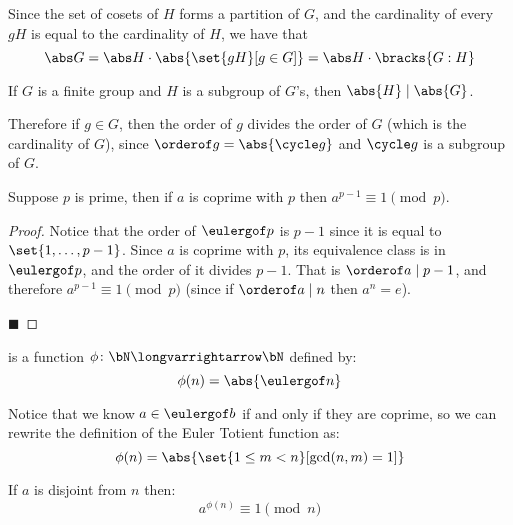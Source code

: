 Since the set of cosets of $H$ forms a partition of $G$, and the cardinality of every $gH$ is equal to the cardinality of $H$, we have that
\[ \abs G = \abs H \cdot \abs{\set{gH}[g\in G]} = \abs H\cdot \bracks{G:H} \]

\begin{thrm*}

    If $G$ is a finite group and $H$ is a subgroup of $G$'s, then $\abs{H}\divides\abs{G}$.

\end{thrm*}

Therefore if $g\in G$, then the order of $g$ divides the order of $G$ (which is the cardinality of $G$), since $\orderof g=\abs{\cycle g}$ and $\cycle g$ is a subgroup of $G$.

\begin{thrm*}

    Suppose $p$ is prime, then if $a$ is coprime with $p$ then $a^{p-1}\equiv 1\pmod p$.

\end{thrm*}

\begin{proof}

    Notice that the order of $\eulergof p$ is $p-1$ since it is equal to $\set{1,\dots,p-1}$.
    Since $a$ is coprime with $p$, its equivalence class is in $\eulergof p$, and the order of it divides $p-1$.
    That is $\orderof a\divides p-1$, and therefore $a^{p-1}\equiv 1\pmod p$ (since if $\orderof a\divides n$ then $a^n=e$).

    \hfill$\blacksquare$

\end{proof}

\begin{defn*}

     is a function $\phi\colon\bN\longvarrightarrow\bN$ defined by:
    \[ \phi(n) = \abs{\eulergof n} \]

\end{defn*}

Notice that we know $a\in\eulergof b$ if and only if they are coprime, so we can rewrite the definition of the Euler Totient function as:
\[ \phi(n) = \abs{\set{1\leq m<n}[\gcd(n,m)=1]} \]

\begin{thrm*}

    If $a$ is disjoint from $n$ then:
    \[ a^{\phi(n)} \equiv 1 \pmod n \]

\end{thrm*}

